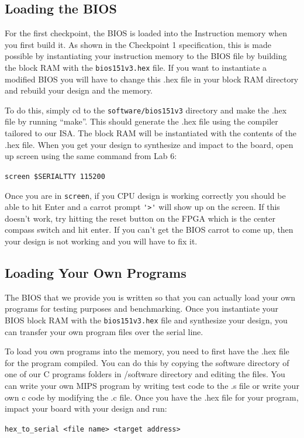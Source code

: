 \documentclass[11pt]{article}
\begin{document}
\subsection{Loading the BIOS}
For the first checkpoint, the BIOS is loaded into the Instruction memory when you first build it.
As shown in the Checkpoint 1 specification, this is made possible by instantiating your
instruction memory to the BIOS file by building the block RAM with the \verb|bios151v3.hex| file. If you
want to instantiate a modified BIOS you will have to change this .hex file in your block RAM
directory and rebuild your design and the memory.

To do this, simply cd to the \verb|software/bios151v3| directory and make the .hex file by running
“make”. This should generate the .hex file using the compiler tailored to our ISA. The
block RAM will be instantiated with the contents of the .hex file.
When you get your design to synthesize and impact to the board, open up screen using the
same command from Lab 6:

\verb|screen $SERIALTTY 115200|

Once you are in \verb|screen|, if you CPU design is working correctly you should be able to hit Enter
and a carrot prompt \verb|'>'| will show up on the screen. If this doesn’t work, try hitting the reset
button on the FPGA which is the center compass switch and hit enter. If you can’t get the BIOS
carrot to come up, then your design is not working and you will have to fix it.

\subsection{Loading Your Own Programs}
The BIOS that we provide you is written so that you can actually load your own programs for
testing purposes and benchmarking. Once you instantiate your BIOS block RAM with the
\verb|bios151v3.hex| file and synthesize your design, you can transfer your own program files over the
serial line.

To load you own programs into the memory, you need to first have the .hex file for the program
compiled. You can do this by copying the software directory of one of our C programs folders in
/software directory and editing the files. You can write your own MIPS program by writing
test code to the .s file or write your own c code by modifying the .c file.
Once you have the .hex file for your program, impact your board with your design and run:

\verb|hex_to_serial <file name> <target address>|
\end{document}

